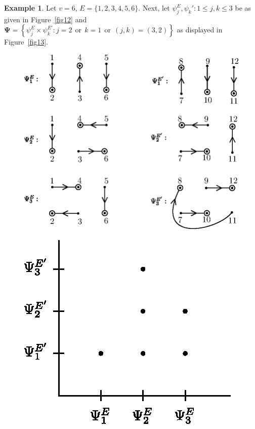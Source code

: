 \documentclass[a4paper,12pt]{article}
\theoremstyle{definition}
\theoremstyle{underlinethm}
\newtheorem{example}{Example}[section]
\theoremstyle{definition}
\begin{document}
\begin{example}\label{example-3.4}
Let $v=6$, $E = \{1,2,3,4,5,6\}$. Next, let $\psi_{j}^{E}, \psi_{k}' : 1 \leq j, k\leq 3$ be as given in Figure~\eqref{fig12} and $\boldsymbol{\Psi} = \left\{\psi_{j}^{E} \times \psi_{k}^{E'} : j=2~~\text{or}~~ k=1~~\text{or}~~(j,k)=(3,2)\right\}$ as displayed in Figure~\eqref{fig13}.
\end{example}


\begin{figure}[h]
\centering
\includegraphics[scale=1]{figure/figures/fig12.eps}
\caption{}\label{fig12}
\end{figure}
\begin{figure}[h]
\centering
\includegraphics[scale=.9]{figure/figures/fig13.eps}
\caption{}\label{fig13}
\end{figure}
\end{document}
